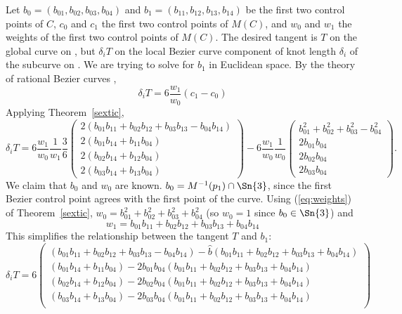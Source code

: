 Let $b_0 = (b_{01}, b_{02}, b_{03}, b_{04})$ and 
$b_1 = (b_{11}, b_{12}, b_{13}, b_{14})$ be 
the first two control points of $C$,
$c_0$ and $c_1$ the first two control points of $M(C)$,
and $w_0$ and $w_1$ the weights of the first two control points of $M(C)$.
The desired tangent is $T$ on the global curve on ,
but $\delta_i T$ on the local Bezier curve component of knot length $\delta_i$
of the subcurve on .
We are trying to solve for $b_1$ in Euclidean space.
By the theory of rational Bezier curves \cite{farin97},
\[
	\delta_i T = 6 \frac{w_1}{w_0} (c_1 - c_0)
\]
Applying Theorem~\ref{sextic}, 
\[
	\delta_i T = 6 \frac{w_1}{w_0} \frac{1}{w_1} \frac{3}{6}
	\left(
	\begin{array}{c}
	2(b_{01}b_{11} + b_{02}b_{12} + b_{03}b_{13} - b_{04}b_{14})\\
	2(b_{01}b_{14} + b_{11}b_{04})\\
	2(b_{02}b_{14} + b_{12}b_{04})\\
	2(b_{03}b_{14} + b_{13}b_{04})
	\end{array} \right)
	- 6 \frac{w_1}{w_0} \frac{1}{w_0}
	\left(
	\begin{array}{c}
	b_{01}^2 + b_{02}^2 + b_{03}^2 - b_{04}^2\\
	2b_{01}b_{04}\\
	2b_{02}b_{04}\\
	2b_{03}b_{04}
	\end{array} \right).
\]
We claim that $b_0$ and $w_0$ are known.
$b_0 = M^{-1}(p_1) \cap \Sn{3}$, since the first Bezier control point agrees
with the first point of the curve.
Using (\ref{eq:weights}) of Theorem~\ref{sextic},
$w_0 = b_{01}^2 + b_{02}^2 + b_{03}^2 + b_{04}^2$ 
(so $w_0=1$ since $b_0 \in \Sn{3}$)
and
\[
  w_1 = b_{01}b_{11} + b_{02}b_{12} + b_{03}b_{13} + b_{04}b_{14}
\]
This simplifies the relationship between the tangent $T$ and $b_1$:
\[
	\delta_i T = 6 \left( \begin{array}{c}
	(b_{01}b_{11} + b_{02}b_{12} + b_{03}b_{13} - b_{04}b_{14})
	- \hat{b} 
	  (b_{01}b_{11} + b_{02}b_{12} + b_{03}b_{13} + b_{04}b_{14}) \\
	(b_{01}b_{14} + b_{11}b_{04})
	- 2b_{01}b_{04} 
	  (b_{01}b_{11} + b_{02}b_{12} + b_{03}b_{13} + b_{04}b_{14}) \\
	(b_{02}b_{14} + b_{12}b_{04})
	- 2b_{02}b_{04}
	  (b_{01}b_{11} + b_{02}b_{12} + b_{03}b_{13} + b_{04}b_{14}) \\
	(b_{03}b_{14} + b_{13}b_{04})
	- 2b_{03}b_{04}
	  (b_{01}b_{11} + b_{02}b_{12} + b_{03}b_{13} + b_{04}b_{14}) \\
	\end{array} \right)
\]
